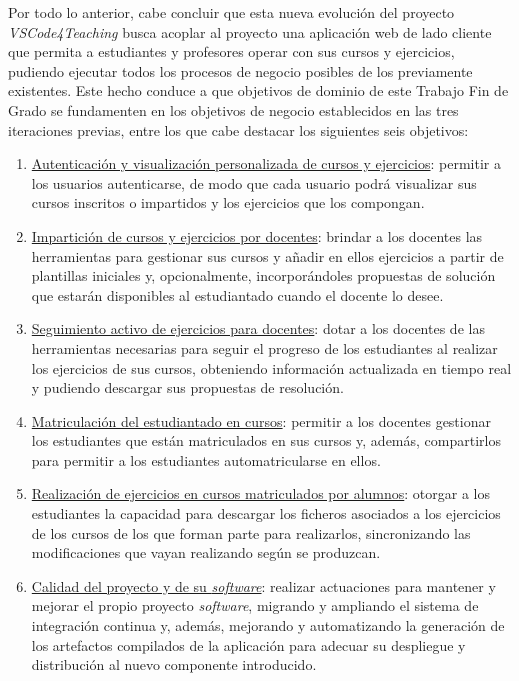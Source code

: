 Por todo lo anterior, cabe concluir que esta nueva evolución del proyecto \textit{VSCode4Teaching} busca acoplar al proyecto una aplicación web de lado cliente que permita a estudiantes y profesores operar con sus cursos y ejercicios, pudiendo ejecutar todos los procesos de negocio posibles de los previamente existentes. Este hecho conduce a que objetivos de dominio de este Trabajo Fin de Grado se fundamenten en los objetivos de negocio establecidos en las tres iteraciones previas, entre los que cabe destacar los siguientes seis objetivos:
\begin{enumerate}
    \item \underline{Autenticación y visualización personalizada de cursos y ejercicios}: permitir a los usuarios autenticarse, de modo que cada usuario podrá visualizar sus cursos inscritos o impartidos y los ejercicios que los compongan.
    \item \underline{Impartición de cursos y ejercicios por docentes}: brindar a los docentes las herramientas para gestionar sus cursos y añadir en ellos ejercicios a partir de plantillas iniciales y, opcionalmente, incorporándoles propuestas de solución que estarán disponibles al estudiantado cuando el docente lo desee.
    \item \underline{Seguimiento activo de ejercicios para docentes}: dotar a los docentes de las herramientas necesarias para seguir el progreso de los estudiantes al realizar los ejercicios de sus cursos, obteniendo información actualizada en tiempo real y pudiendo descargar sus propuestas de resolución.
    \item \underline{Matriculación del estudiantado en cursos}: permitir a los docentes gestionar los estudiantes que están matriculados en sus cursos y, además, compartirlos para permitir a los estudiantes automatricularse en ellos.
    \item \underline{Realización de ejercicios en cursos matriculados por alumnos}: otorgar a los estudiantes la capacidad para descargar los ficheros asociados a los ejercicios de los cursos de los que forman parte para realizarlos, sincronizando las modificaciones que vayan realizando según se produzcan.
    \item \underline{Calidad del proyecto y de su \textit{software}}: realizar actuaciones para mantener y mejorar el propio proyecto \textit{software}, migrando y ampliando el sistema de integración continua y, además, mejorando y automatizando la generación de los artefactos compilados de la aplicación para adecuar su despliegue y distribución al nuevo componente introducido.
\end{enumerate}